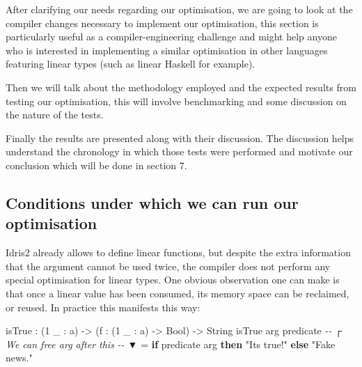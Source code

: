 \documentclass[
]{article}
\newenvironment{Shaded}{}{}
\newcommand{\CommentTok}[1]{\textcolor[rgb]{0.38,0.63,0.69}{\textit{#1}}}
\newcommand{\DataTypeTok}[1]{\textcolor[rgb]{0.56,0.13,0.00}{#1}}
\newcommand{\DecValTok}[1]{\textcolor[rgb]{0.25,0.63,0.44}{#1}}
\newcommand{\KeywordTok}[1]{\textcolor[rgb]{0.00,0.44,0.13}{\textbf{#1}}}
\newcommand{\NormalTok}[1]{#1}
\newcommand{\OperatorTok}[1]{\textcolor[rgb]{0.40,0.40,0.40}{#1}}
\newcommand{\OtherTok}[1]{\textcolor[rgb]{0.00,0.44,0.13}{#1}}
\newcommand{\StringTok}[1]{\textcolor[rgb]{0.25,0.44,0.63}{#1}}
\begin{document}
After clarifying our needs regarding our optimisation, we are going to
look at the compiler changes necessary to implement our optimisation,
this section is particularly useful as a compiler-engineering challenge
and might help anyone who is interested in implementing a similar
optimisation in other languages featuring linear types (such as linear
Haskell for example).

Then we will talk about the methodology employed and the expected
results from testing our optimisation, this will involve benchmarking
and some discussion on the nature of the tests.

Finally the results are presented along with their discussion. The
discussion helps understand the chronology in which those tests were
performed and motivate our conclusion which will be done in section 7.

\hypertarget{conditions-under-which-we-can-run-our-optimisation}{%
\subsection{Conditions under which we can run our
optimisation}\label{conditions-under-which-we-can-run-our-optimisation}}

Idris2 already allows to define linear functions, but despite the extra
information that the argument cannot be used twice, the compiler does
not perform any special optimisation for linear types. One obvious
observation one can make is that once a linear value has been consumed,
its memory space can be reclaimed, or reused. In practice this manifests
this way:

\begin{Shaded}
\begin{Highlighting}[]
\NormalTok{isTrue }\OperatorTok{:}\NormalTok{ (}\DecValTok{1}\NormalTok{ \_ }\OperatorTok{:}\NormalTok{ a) }\OtherTok{{-}\textgreater{}}\NormalTok{ (f }\OperatorTok{:}\NormalTok{ (}\DecValTok{1}\NormalTok{ \_ }\OperatorTok{:}\NormalTok{ a) }\OtherTok{{-}\textgreater{}} \DataTypeTok{Bool}\NormalTok{) }\OtherTok{{-}\textgreater{}} \DataTypeTok{String}
\NormalTok{isTrue arg predicate}
\CommentTok{{-}{-}                ┌ We can free \textasciigrave{}arg\textasciigrave{} after this}
\CommentTok{{-}{-}                ▼}
  \OtherTok{=} \KeywordTok{if}\NormalTok{ predicate arg }\KeywordTok{then} \StringTok{"It\textquotesingle{}s true!"}
                     \KeywordTok{else} \StringTok{"Fake news."}
\end{Highlighting}
\end{Shaded}
\end{document}
